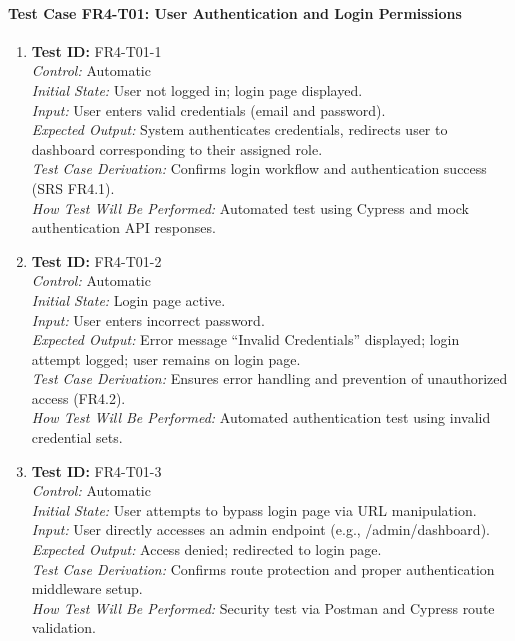\documentclass[12pt, titlepage]{article}
\begin{document}
\paragraph{Test Case FR4-T01: User Authentication and Login Permissions}

\begin{enumerate}\setlength{\itemsep}{1em}
    \item \textbf{Test ID:} FR4-T01-1\\[0.5em]
    \textit{Control:} Automatic\\[0.3em]
    \textit{Initial State:} User not logged in; login page displayed.\\[0.3em]
    \textit{Input:} User enters valid credentials (email and password).\\[0.3em]
    \textit{Expected Output:} System authenticates credentials, redirects user to dashboard corresponding to their assigned role.\\[0.3em]
    \textit{Test Case Derivation:} Confirms login workflow and authentication success (SRS FR4.1).\\[0.3em]
    \textit{How Test Will Be Performed:} Automated test using Cypress and mock authentication API responses.

    \item \textbf{Test ID:} FR4-T01-2\\[0.5em]
    \textit{Control:} Automatic\\[0.3em]
    \textit{Initial State:} Login page active.\\[0.3em]
    \textit{Input:} User enters incorrect password.\\[0.3em]
    \textit{Expected Output:} Error message “Invalid Credentials” displayed; login attempt logged; user remains on login page.\\[0.3em]
    \textit{Test Case Derivation:} Ensures error handling and prevention of unauthorized access (FR4.2).\\[0.3em]
    \textit{How Test Will Be Performed:} Automated authentication test using invalid credential sets.

    \item \textbf{Test ID:} FR4-T01-3\\[0.5em]
    \textit{Control:} Automatic\\[0.3em]
    \textit{Initial State:} User attempts to bypass login page via URL manipulation.\\[0.3em]
    \textit{Input:} User directly accesses an admin endpoint (e.g., /admin/dashboard).\\[0.3em]
    \textit{Expected Output:} Access denied; redirected to login page.\\[0.3em]
    \textit{Test Case Derivation:} Confirms route protection and proper authentication middleware setup.\\[0.3em]
    \textit{How Test Will Be Performed:} Security test via Postman and Cypress route validation.
\end{enumerate}
\end{document}
